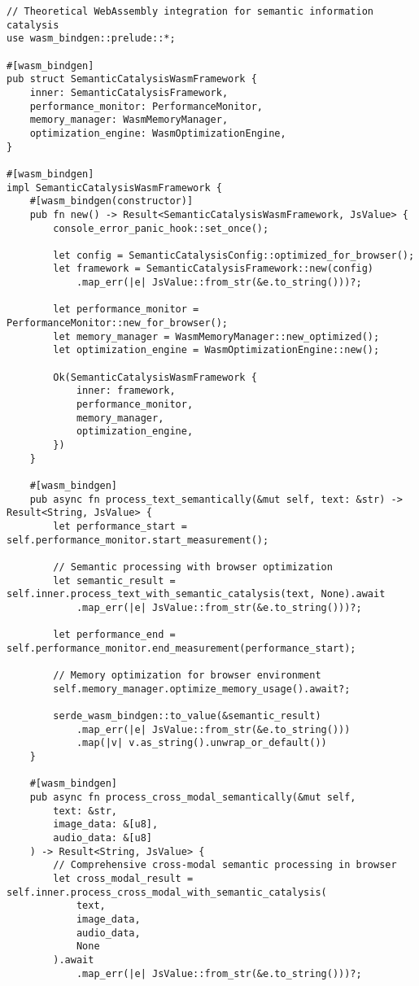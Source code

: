 \documentclass[12pt,a4paper,twoside]{article}
\begin{document}
\begin{lstlisting}[caption=Comprehensive WebAssembly Integration Architecture]
// Theoretical WebAssembly integration for semantic information catalysis
use wasm_bindgen::prelude::*;

#[wasm_bindgen]
pub struct SemanticCatalysisWasmFramework {
    inner: SemanticCatalysisFramework,
    performance_monitor: PerformanceMonitor,
    memory_manager: WasmMemoryManager,
    optimization_engine: WasmOptimizationEngine,
}

#[wasm_bindgen]
impl SemanticCatalysisWasmFramework {
    #[wasm_bindgen(constructor)]
    pub fn new() -> Result<SemanticCatalysisWasmFramework, JsValue> {
        console_error_panic_hook::set_once();

        let config = SemanticCatalysisConfig::optimized_for_browser();
        let framework = SemanticCatalysisFramework::new(config)
            .map_err(|e| JsValue::from_str(&e.to_string()))?;

        let performance_monitor = PerformanceMonitor::new_for_browser();
        let memory_manager = WasmMemoryManager::new_optimized();
        let optimization_engine = WasmOptimizationEngine::new();

        Ok(SemanticCatalysisWasmFramework {
            inner: framework,
            performance_monitor,
            memory_manager,
            optimization_engine,
        })
    }

    #[wasm_bindgen]
    pub async fn process_text_semantically(&mut self, text: &str) -> Result<String, JsValue> {
        let performance_start = self.performance_monitor.start_measurement();

        // Semantic processing with browser optimization
        let semantic_result = self.inner.process_text_with_semantic_catalysis(text, None).await
            .map_err(|e| JsValue::from_str(&e.to_string()))?;

        let performance_end = self.performance_monitor.end_measurement(performance_start);

        // Memory optimization for browser environment
        self.memory_manager.optimize_memory_usage().await?;

        serde_wasm_bindgen::to_value(&semantic_result)
            .map_err(|e| JsValue::from_str(&e.to_string()))
            .map(|v| v.as_string().unwrap_or_default())
    }

    #[wasm_bindgen]
    pub async fn process_cross_modal_semantically(&mut self,
        text: &str,
        image_data: &[u8],
        audio_data: &[u8]
    ) -> Result<String, JsValue> {
        // Comprehensive cross-modal semantic processing in browser
        let cross_modal_result = self.inner.process_cross_modal_with_semantic_catalysis(
            text,
            image_data,
            audio_data,
            None
        ).await
            .map_err(|e| JsValue::from_str(&e.to_string()))?;


\end{lstlisting}
\end{document}

